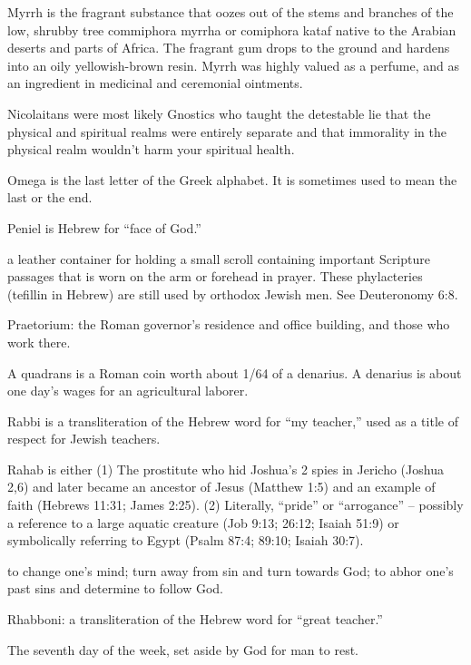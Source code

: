 \begin{multicols}{2}
Myrrh is the fragrant substance that oozes out of the stems and
branches of the low, shrubby tree commiphora myrrha or comiphora
kataf native to the Arabian deserts and parts of Africa. The fragrant
gum drops to the ground and hardens into an oily yellowish-brown
resin. Myrrh was highly valued as a perfume, and as an ingredient in
medicinal and ceremonial ointments.

Nicolaitans were most likely Gnostics who taught the detestable lie
that the physical and spiritual realms were entirely separate and
that immorality in the physical realm wouldn't harm your spiritual
health.

Omega is the last letter of the Greek alphabet. It is sometimes used
to mean the last or the end.

Peniel is Hebrew for {``}face of God.{''}

a leather container for holding a small scroll containing important
Scripture passages that is worn on the arm or forehead in prayer.
These phylacteries (tefillin in Hebrew) are still used by orthodox
Jewish men. See Deuteronomy 6:8.

Praetorium: the Roman governor's residence and office building, and
those who work there.

A quadrans is a Roman coin worth about 1/64 of a denarius. A denarius
is about one day's wages for an agricultural laborer.

Rabbi is a transliteration of the Hebrew word for {``}my teacher,{''}
used as a title of respect for Jewish teachers.

Rahab is either (1) The prostitute who hid Joshua's 2 spies in
Jericho (Joshua 2,6) and later became an ancestor of Jesus (Matthew
1:5) and an example of faith (Hebrews 11:31; James 2:25). (2)
Literally, {``}pride{''} or {``}arrogance{''} -- possibly a reference
to a large aquatic creature (Job 9:13; 26:12; Isaiah 51:9) or
symbolically referring to Egypt (Psalm 87:4; 89:10; Isaiah 30:7).

to change one's mind; turn away from sin and turn towards God; to
abhor one's past sins and determine to follow God.

Rhabboni: a transliteration of the Hebrew word for {``}great
teacher.{''}

The seventh day of the week, set aside by God for man to rest.


\end{multicols}
